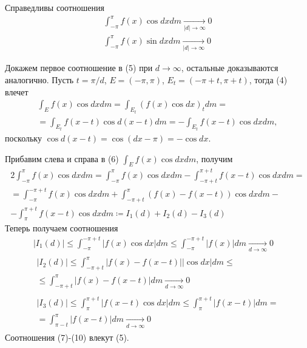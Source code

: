 \documentclass[main]{subfiles}
\begin{document}
\begin{theorem}
    Справедливы соотношения
    \[\begin{gathered}
            \int_{-\pi}^{\pi} f(x) \cos dx dm \xrightarrow[|d| \to \infty]{} 0\\
            \int_{-\pi}^{\pi} f(x) \sin dx dm \xrightarrow[|d| \to \infty]{} 0
        \end{gathered}\tag{5}\]
\end{theorem}
\begin{longProof}
    Докажем первое соотношение в (5) при $d \to \infty$, остальные доказываются аналогично.
    Пусть $t = \pi/d$, $E = (-\pi, \pi)$, $E_t = (-\pi + t, \pi +t)$, тогда (4) влечет
    \begin{multline*}
        \int_E f(x) \cos dx dm = \int_{E_t}(f(x) \cos dx)_t dm = \\
        = \int_{E_t} f(x-t) \cos d(x-t) dm = - \int_{E_t} f(x-t) \cos dx dm, \tag{6}
    \end{multline*}
    поскольку $\cos d(x - t) = \cos (dx - \pi) = - \cos dx$.

    Прибавим слева и справа в (6) $\int_E f(x) \cos dx dm$, получим
    \begin{multline*}
        2 \int_{-\pi}^{\pi} f(x) \cos dx dm = \int_{-\pi}^{\pi} f(x) \cos dx dm - \int_{-\pi + t}^{\pi + t} f(x - t) \cos dx dm = \\
        = \int_{-\pi}^{-\pi + t} f(x)\cos dx dm + \int_{-\pi+t}^{\pi} (f(x) - f(x - t)) \cos dx dm - \\
        - \int_{\pi}^{\pi + t} f(x - t) \cos dx dm \coloneq I_1(d) + I_2(d) - I_3(d) \tag{7}
    \end{multline*}
    Теперь получаем соотношения
    \begin{gather*}
        \left| I_1(d) \right| \le \int_{-\pi}^{-\pi + t} |f(x)\cos dx| dm \le \int_{-\pi}^{-\pi + t} |f(x)| dm \xrightarrow[d \to \infty]{} 0 \tag{8} \\
        \begin{multlined}
            \left| I_2(d) \right| \le \int_{-\pi+t}^{\pi} |f(x) - f(x - t)||\cos dx| dm \le \\
            \le \int_{-\pi+t}^{\pi} |f(x) - f(x - t)| dm \xrightarrow[d \to \infty]{} 0
        \end{multlined} \tag{9} \\
        \begin{multlined}
            \left| I_3(d) \right| \le \int_{\pi}^{\pi + t} |f(x - t) \cos dx| dm \le \int_{\pi}^{\pi + t} |f(x - t)| dm = \\
            = \int_{\pi-t}^{\pi} |f(x - t)| dm \xrightarrow[d \to \infty]{} 0
        \end{multlined} \tag{10}
    \end{gather*}
    Соотношения (7)-(10) влекут (5).
\end{longProof}
\end{document}
